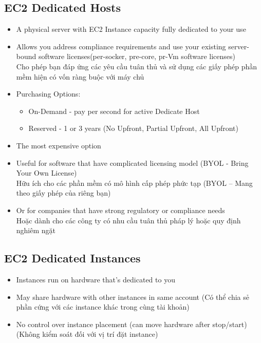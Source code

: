 \subsection{EC2 Dedicated Hosts}

\begin{itemize}
	\item A physical server with EC2 Instance capacity fully dedicated to your use
	\item Allows you address compliance requirements and use your existing server-bound software licenses(per-socker, pre-core, pr-Vm software licenses) \\ Cho phép bạn đáp ứng các yêu cầu tuân thủ và sử dụng các giấy phép phần mềm hiện có vốn ràng buộc với máy chủ
	\item Purchasing Options:
	\begin{itemize}
		\item On-Demand - pay per second for active Dedicate Host
		\item Reserved - 1 or 3 years (No Upfront, Partial Upfront, All Upfront)
	\end{itemize}
	\item The most expensive option
	\item Useful for software that have complicated licensing model (BYOL - Bring Your Own License) \\ Hữu ích cho các phần mềm có mô hình cấp phép phức tạp (BYOL – Mang theo giấy phép của riêng bạn)
	\item Or for companies that have strong regulatory or compliance needs \\ Hoặc dành cho các công ty có nhu cầu tuân thủ pháp lý hoặc quy định nghiêm ngặt
\end{itemize}

\subsection{EC2 Dedicated Instances}

\begin{itemize}
	\item Instances run on hardware that's dedicated to you
	\item May share hardware with other instances in same account (Có thể chia sẻ phần cứng với các instance khác trong cùng tài khoản)
	\item No control over instance placement (can move hardware after stop/start) (Không kiểm soát đối với vị trí đặt instance)
\end{itemize}

